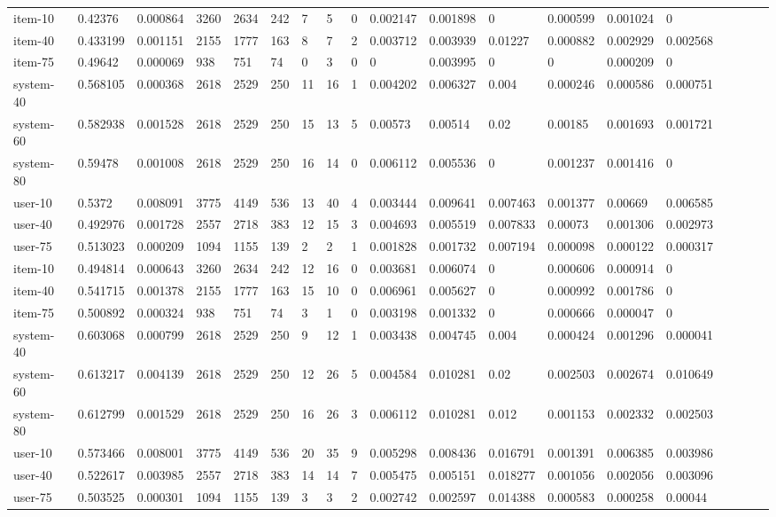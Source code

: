 \begin{table}
{\begin{tabular}{*{19}l}
item-10		&	0.42376  &	0.000864 &	3260 &	2634 &	242 &	7  &	5 &	0 &	0.002147 &	0.001898 &	0 &	0.000599 &	0.001024 &	0 &	 \\
item-40		&	0.433199 &	0.001151 &	2155 &	1777 &	163 &	8  &	7 &	2 &	0.003712 &	0.003939 &	0.01227 &	0.000882 &	0.002929 &	0.002568 &	 \\
item-75		&	0.49642  &	0.000069 &	938  &	751  &	74 &	0  &	3 &	0 &	0 &	0.003995 &	0 &	0 &	0.000209 &	0 &	 \\
system-40	&	0.568105 &	0.000368 &	2618 &	2529 &	250 &	11 &	16 &	1 &	0.004202 &	0.006327 &	0.004 &	0.000246 &	0.000586 &	0.000751 &	 \\
system-60	&	0.582938 &	0.001528 &	2618 &	2529 &	250 &	15 &	13 &	5 &	0.00573 &	0.00514 &	0.02 &	0.00185 &	0.001693 &	0.001721 &	 \\
system-80	&	0.59478  &	0.001008 &	2618 &	2529 &	250 &	16 &	14 &	0 &	0.006112 &	0.005536 &	0 &	0.001237 &	0.001416 &	0 &	 \\
user-10		&	0.5372   &	0.008091 &	3775 &	4149 &	536 &	13 &	40 &	4 &	0.003444 &	0.009641 &	0.007463 &	0.001377 &	0.00669 &	0.006585 &	 \\
user-40		&	0.492976 &	0.001728 &	2557 &	2718 &	383 &	12 &	15 &	3 &	0.004693 &	0.005519 &	0.007833 &	0.00073 &	0.001306 &	0.002973 &	 \\
user-75		&	0.513023 &	0.000209 &	1094 &	1155 &	139 &	2  &	2 &	1 &	0.001828 &	0.001732 &	0.007194 &	0.000098 &	0.000122 &	0.000317 &	 \\

item-10		&	0.494814 &	0.000643 &	3260 &	2634 &	242 &	12 &	16 &	0 &	0.003681 &	0.006074 &	0 &	0.000606 &	0.000914 &	0 &	 \\
item-40		&	0.541715 &	0.001378 &	2155 &	1777 &	163 &	15 &	10 &	0 &	0.006961 &	0.005627 &	0 &	0.000992 &	0.001786 &	0 &	 \\
item-75		&	0.500892 &	0.000324 &	938 &	751 &	74 &	3  &	1 &	0 &	0.003198 &	0.001332 &	0 &	0.000666 &	0.000047 &	0 &	 \\
system-40	&	0.603068 &	0.000799 &	2618 &	2529 &	250 &	9  &	12 &	1 &	0.003438 &	0.004745 &	0.004 &	0.000424 &	0.001296 &	0.000041 &	 \\
system-60	&	0.613217 &	0.004139 &	2618 &	2529 &	250 &	12 &	26 &	5 &	0.004584 &	0.010281 &	0.02 &	0.002503 &	0.002674 &	0.010649 &	 \\
system-80	&	0.612799 &	0.001529 &	2618 &	2529 &	250 &	16 &	26 &	3 &	0.006112 &	0.010281 &	0.012 &	0.001153 &	0.002332 &	0.002503 &	 \\
user-10		&	0.573466 &	0.008001 &	3775 &	4149 &	536 &	20 &	35 &	9 &	0.005298 &	0.008436 &	0.016791 &	0.001391 &	0.006385 &	0.003986 &	 \\
user-40		&	0.522617 &	0.003985 &	2557 &	2718 &	383 &	14 &	14 &	7 &	0.005475 &	0.005151 &	0.018277 &	0.001056 &	0.002056 &	0.003096 &	 \\
user-75		&	0.503525 &	0.000301 &	1094 &	1155 &	139 &	3 &	3 &	2 &	0.002742 &	0.002597 &	0.014388 &	0.000583 &	0.000258 &	0.00044 &	 \\




\end{tabular}}
\end{table}
